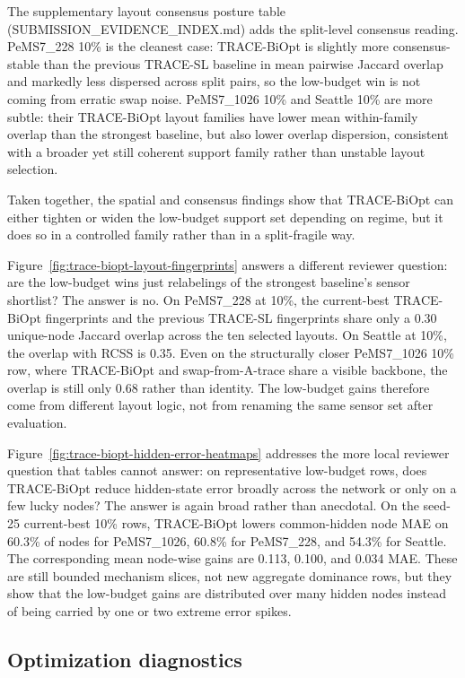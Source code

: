 The supplementary layout consensus posture table
(SUBMISSION\_EVIDENCE\_INDEX.md) adds the split-level consensus reading.
PeMS7\_228 10\% is the cleanest case: TRACE-BiOpt is slightly more
consensus-stable than the previous TRACE-SL baseline in mean pairwise Jaccard
overlap and markedly less dispersed across split pairs, so the low-budget win
is not coming from erratic swap noise. PeMS7\_1026 10\% and Seattle 10\% are
more subtle: their TRACE-BiOpt layout families have lower mean within-family
overlap than the strongest baseline, but also lower overlap dispersion,
consistent with a broader yet still coherent support family rather than
unstable layout selection.

Taken together, the spatial and consensus findings show that TRACE-BiOpt can
either tighten or widen the low-budget support set depending on regime, but it
does so in a controlled family rather than in a split-fragile way.

Figure~\ref{fig:trace-biopt-layout-fingerprints} answers a different reviewer
question: are the low-budget wins just relabelings of the strongest baseline's
sensor shortlist? The answer is no. On PeMS7\_228 at 10\%, the current-best
TRACE-BiOpt fingerprints and the previous TRACE-SL fingerprints share only a
0.30 unique-node Jaccard overlap across the ten selected layouts. On Seattle
at 10\%, the overlap with RCSS is 0.35. Even on the structurally closer
PeMS7\_1026 10\% row, where TRACE-BiOpt and swap-from-A-trace share a visible
backbone, the overlap is still only 0.68 rather than identity. The low-budget
gains therefore come from different layout logic, not from renaming the same
sensor set after evaluation.

Figure~\ref{fig:trace-biopt-hidden-error-heatmaps} addresses the more local
reviewer question that tables cannot answer: on representative low-budget rows,
does TRACE-BiOpt reduce hidden-state error broadly across the network or only on
a few lucky nodes? The answer is again broad rather than anecdotal. On the
seed-25 current-best 10\% rows, TRACE-BiOpt lowers common-hidden node MAE on
60.3\% of nodes for PeMS7\_1026, 60.8\% for PeMS7\_228, and 54.3\% for
Seattle. The corresponding mean node-wise gains are 0.113, 0.100, and 0.034
MAE. These are still bounded mechanism slices, not new aggregate dominance
rows, but they show that the low-budget gains are distributed over many hidden
nodes instead of being carried by one or two extreme error spikes.

\subsection{Optimization diagnostics}

